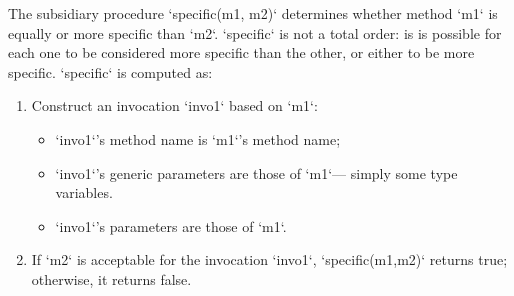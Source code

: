 The subsidiary procedure \xcd`specific(m1, m2)` determines whether method
\xcd`m1` is equally or more specific than \xcd`m2`.  \xcd`specific` is not a
total order: is is possible for each one to be considered more specific than
the other, or either to be more specific.  \xcd`specific` is computed as: 
\begin{enumerate}
\item Construct an invocation \xcd`invo1` based on \xcd`m1`: 
      \begin{itemize}
      \item \xcd`invo1`'s method name is \xcd`m1`'s method name;
      \item \xcd`invo1`'s generic parameters are those of \xcd`m1`--- simply
            some type variables.
      \item \xcd`invo1`'s parameters are those of \xcd`m1`.
      \end{itemize}
\item If \xcd`m2` is acceptable for the invocation \xcd`invo1`,
      \xcd`specific(m1,m2)` returns true; otherwise, it returns false.
\end{enumerate}

